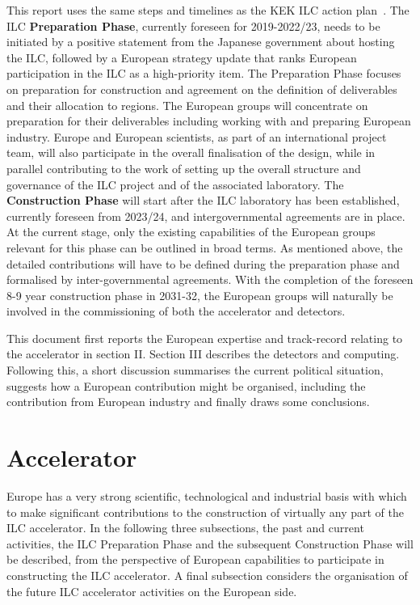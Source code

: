 \documentclass[%
 reprint,
 floatfix,
 amsmath,amssymb,
 aps,
]{revtex4-1}
\begin{document}
This report uses the same steps and timelines as the KEK ILC action plan~\cite{kekactionplan}. The ILC \textbf{Preparation Phase}, currently foreseen for 2019-2022/23, needs to be initiated by a positive statement from the Japanese government about hosting the ILC, followed by a European strategy update that ranks European participation in the ILC as a high-priority item. The Preparation Phase focuses on preparation for construction and agreement on the definition of deliverables and their allocation to regions. The European groups will concentrate on preparation for their deliverables including working with and preparing European industry. Europe and European scientists, as part of an international project team, will also participate in the overall finalisation of the design, while in parallel contributing to the work of setting up the overall structure and governance of the ILC project and of the associated laboratory.
The \textbf{Construction Phase} will start after the ILC laboratory has been established, currently foreseen from 2023/24, and intergovernmental agreements are in place. At the current stage, only the existing capabilities of the European groups relevant for this phase can be outlined in broad terms. As mentioned above, the detailed contributions will have to be defined during the preparation phase and formalised by inter-governmental agreements.  With the completion of the foreseen 8-9 year construction phase in 2031-32, the European groups will naturally be involved in the commissioning of both the accelerator and detectors.

This document first reports the European expertise and track-record relating to the accelerator in section II. Section III describes the detectors and computing. Following this, a short discussion summarises the current political situation, suggests how a
European contribution might be organised, including the contribution from European industry and finally draws some conclusions.


\section{\label{sec:acc}Accelerator}
Europe has a very strong scientific, technological and industrial basis with which to make significant contributions to the construction of virtually 
any part of the ILC accelerator. In the following three subsections, the past and current activities, the ILC Preparation Phase and the subsequent Construction Phase will be described, from the perspective of European capabilities to participate in constructing the ILC accelerator. 
A final subsection considers the organisation of the future ILC accelerator activities on the European side. 
\end{document}
